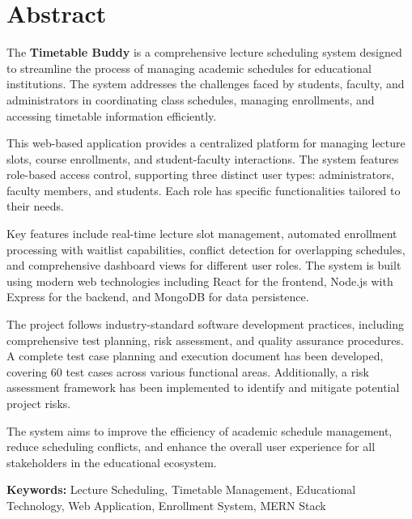 \chapter*{Abstract}
\thispagestyle{empty}

The \textbf{Timetable Buddy} is a comprehensive lecture scheduling system designed to streamline the process of managing academic schedules for educational institutions. The system addresses the challenges faced by students, faculty, and administrators in coordinating class schedules, managing enrollments, and accessing timetable information efficiently.

This web-based application provides a centralized platform for managing lecture slots, course enrollments, and student-faculty interactions. The system features role-based access control, supporting three distinct user types: administrators, faculty members, and students. Each role has specific functionalities tailored to their needs.

Key features include real-time lecture slot management, automated enrollment processing with waitlist capabilities, conflict detection for overlapping schedules, and comprehensive dashboard views for different user roles. The system is built using modern web technologies including React for the frontend, Node.js with Express for the backend, and MongoDB for data persistence.

The project follows industry-standard software development practices, including comprehensive test planning, risk assessment, and quality assurance procedures. A complete test case planning and execution document has been developed, covering 60 test cases across various functional areas. Additionally, a risk assessment framework has been implemented to identify and mitigate potential project risks.

The system aims to improve the efficiency of academic schedule management, reduce scheduling conflicts, and enhance the overall user experience for all stakeholders in the educational ecosystem.

\textbf{Keywords:} Lecture Scheduling, Timetable Management, Educational Technology, Web Application, Enrollment System, MERN Stack
